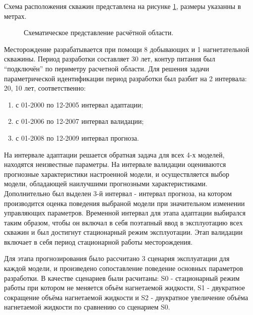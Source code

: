 \documentclass{article}
\begin{document}
Схема расположения скважин представлена на рисунке \ref{fig:map}, размеры указанны в метрах. 
\begin{figure}
    \caption{Схематическое представление расчётной области.}
	\label{fig:map}
\end{figure}

Месторождение разрабатывается при помощи 8 добывающих и 1 нагнетательной скважины. Период разработки составляет 30 лет, контур питания был “подключён” по периметру расчетной области. Для решения задачи параметрической идентификации период разработки был разбит на 2 интервала: 20, 10 лет, соответственно:
\begin{enumerate}
\item с 01-2000 по 12-2005  интервал адаптации;
\item с 01-2006 по 12-2007  интервал валидации;
\item с 01-2008 по 12-2009  интервал прогноза.
\end{enumerate}

На интервале адаптации решается обратная задача для всех 4-х моделей, находятся неизвестные параметры. На интервале валидации оцениваются прогнозные характеристики настроенной модели, и осуществляется выбор модели, обладающей наилучшими прогнозными характеристиками. Дополнительно был выделен 3-й интервал - интервал прогноза, на котором производится оценка поведения выбраной модели при значительном изменении управляющих параметров. Временной интервал для этапа адаптации выбирался таким образом, чтобы он включал в себя поэтапный ввод в эксплуотацию всех скважин и был достигнут стационарный режим эксплуотации. Этап валидации включает в себя период стационарной работы месторождения. 

Для этапа прогнозирования было рассчитано 3 сценария эксплуатации для каждой модели, и произведено сопоставление поведение основных параметров разработки. В качестве сценариев были расчитаны: S0 - стационарный режим работы при котором не меняется объём нагнетаемой жидкости, S1 - двукратное сокращение объёма нагнетаемой жидкости и S2 - двукратное увеличение объёма нагнетаемой жидкости по сравнению со сценарием S0. 
\end{document}
